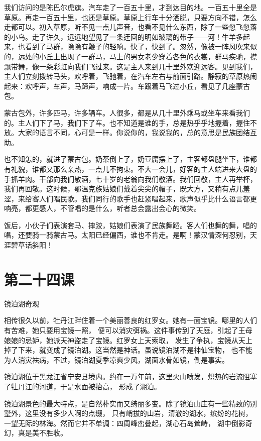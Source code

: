 \documentclass[12pt,UTF8]{ctexbook}
\begin{document}
我们访问的是陈巴尔虎旗。汽车走了一百五十里，才到达目的地。一百五十里全是草原。再走一百五十里，也还是草原。草原上行车十分洒脱，只要方向不错，怎么走都可以。初入草原，听不见一点儿声音，也看不见什么东西，除了一些忽飞忽落的小鸟。走了许久，远远地望见了一条迂回的明如玻璃的带子——河！牛羊多起来，也看到了马群，隐隐有鞭子的轻响。快了，快到了。忽然，像被一阵风吹来似的，远处的小丘上出现了一群马，马上的男女老少穿着各色的衣裳，群马疾驰，襟飘带舞，像一条彩虹向我们飞过来。这是主人来到几十里外欢迎远客。见到我们，主人们立刻拨转马头，欢呼着，飞驰着，在汽车左右与前面引路。静寂的草原热闹起来：欢呼声，车声，马蹄声，响成一片。车跟着马飞过小丘，看见了几座蒙古包。

蒙古包外，许多匹马，许多辆车。人很多，都是从几十里外乘马或坐车来看我们的。主人们下了马，我们下了车。也不知道是谁的手，总是热乎乎地握着，握住不放。大家的语言不同，心可是一样。你说你的，我说我的，总的意思是民族团结互助。

也不知怎的，就进了蒙古包。奶茶倒上了，奶豆腐摆上了，主客都盘腿坐下，谁都有礼貌，谁都又那么亲热，一点儿不拘束。不大一会儿，好客的主人端进来大盘的手抓羊肉。干部向我们敬酒，七十岁的老翁向我们敬酒。我们回敬，主人再举杯，我们再回敬。这时候，鄂温克族姑娘们戴着尖尖的帽子，既大方，又稍有点儿羞涩，来给客人们唱民歌。我们同行的歌手也赶紧唱起来，歌声似乎比什么语言都更响亮，都更感人，不管唱的是什么，听者总会露出会心的微笑。

饭后，小伙子们表演套马、摔跤，姑娘们表演了民族舞蹈。客人们也舞的舞，唱的唱，还要骑一骑蒙古马。太阳已经偏西，谁也不肯走。是啊！蒙汉情深何忍别，天涯碧草话斜阳！

\section{第二十四课}

镜泊湖奇观

相传很久以前，牡丹江畔住着一个美丽善良的红罗女。她有一面宝镜。哪里的人们有苦难，她只要用宝镜一照，
便可以消灾弭祸。这件事传到了天庭，引起了王母娘娘的忌妒，她派天神盗走了宝镜。红罗女上天索取，
发生了争执，宝镜从天上掉了下来，就变成了镜泊湖。这当然是神话。虽说镜泊湖不是神仙宝物，
也不能为人消灾袪病，不过，镜泊湖夏季凉爽少风，湖面水骨如镜，倒是事实。

镜泊湖位于黑龙江省宁安县境内。约在一万年前，这里火山喷发，炽热的岩流阻塞了牡丹江的河道，于是水面被抬高，
形成了湖泊。

镜泊湖景色的最大特点，是自然朴实而又绮丽多变。除了镜泊山庄有一些精致的别墅外，这里没有多少人啊的点缀，
只有峭拔的山岩，清澈的湖水，缤纷的花树，一望无际的林海。然而它并不单调：四周峰峦叠起，湖心石岛耸峙，
湖中倒影奇幻，真是美不胜收。
\end{document}
